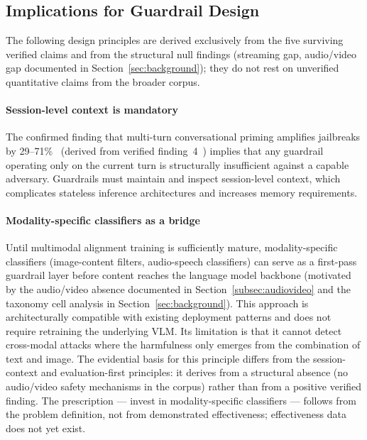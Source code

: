 \subsection{Implications for Guardrail Design}
\label{subsec:implications}

The following design principles are derived exclusively from the five surviving verified claims and from the structural null findings (streaming gap, audio/video gap documented in Section~\ref{sec:background}); they do not rest on unverified quantitative claims from the broader corpus.

\paragraph{Session-level context is mandatory}
The confirmed finding that multi-turn conversational priming amplifies jailbreaks
by 29--71\%~\cite{russinovich2024greatescalation} (derived from verified finding~4~\cite{russinovich2024greatescalation,li2024llm}) implies that any guardrail
operating only on the current turn is structurally insufficient against a capable
adversary.
Guardrails must maintain and inspect session-level context, which complicates
stateless inference architectures and increases memory requirements.

\paragraph{Modality-specific classifiers as a bridge}
Until multimodal alignment training is sufficiently mature, modality-specific
classifiers (image-content filters, audio-speech classifiers) can serve as a
first-pass guardrail layer before content reaches the language model backbone
(motivated by the audio/video absence documented in Section~\ref{subsec:audiovideo} and the taxonomy cell analysis in Section~\ref{sec:background}).
This approach is architecturally compatible with existing deployment patterns and
does not require retraining the underlying VLM.
Its limitation is that it cannot detect cross-modal attacks where the harmfulness
only emerges from the combination of text and image.
The evidential basis for this principle differs from the session-context and evaluation-first principles: it derives from a structural absence (no audio/video safety mechanisms in the corpus) rather than from a positive verified finding.
The prescription --- invest in modality-specific classifiers --- follows from the problem definition, not from demonstrated effectiveness; effectiveness data does not yet exist.

